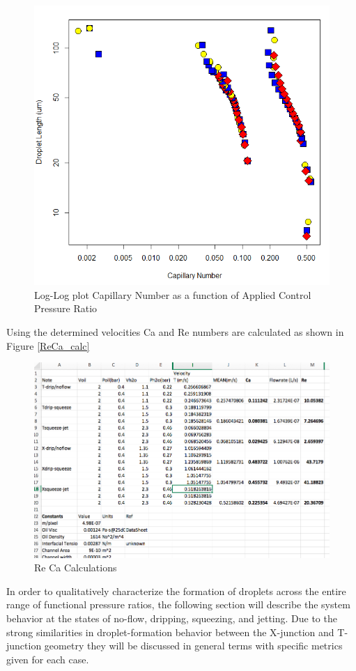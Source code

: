 \begin{figure}[h]
\centering 
\includegraphics[width=0.750\columnwidth]{ca_pr.PNG} 
\caption[Capillary Number as a function of Applied Control Pressure Ratio]{Log-Log plot Capillary Number as a function of Applied Control Pressure Ratio }
\label{fig:ca_pr} 
\end{figure}


Using the determined velocities Ca and Re numbers are calculated as shown in Figure \vref{ReCa_calc}

\begin{figure}[h]
\centering 
\includegraphics[width=01.0\columnwidth]{ReCa_calc.PNG} 
\caption[Re Ca Calculations]{Re Ca Calculations }
\label{fig:ReCa_calc} 
\end{figure}


\clearpage

In order to qualitatively characterize the formation of droplets across the entire range of functional pressure ratios, the following section will describe the system behavior at the states of no-flow, dripping, squeezing, and jetting. Due to the strong similarities in droplet-formation behavior between the X-junction and T-junction geometry they will be discussed in general terms with specific metrics given for each case.



